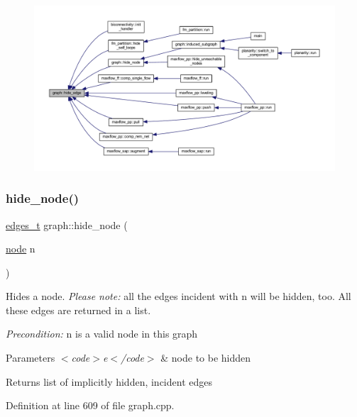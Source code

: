 \begin{figure}[H]
\begin{center}
\leavevmode
\includegraphics[width=350pt]{classgraph_ab2f8520bcac080d73c55228fecc61825_icgraph}
\end{center}
\end{figure}
\mbox{\label{classgraph_a214618b5e3c02695779350532506e225}} 
\subsubsection{\texorpdfstring{hide\+\_\+node()}{hide\_node()}}
{\footnotesize\ttfamily \mbox{\hyperlink{edge_8h_a8f9587479bda6cf612c103494b3858e3}{edges\+\_\+t}} graph\+::hide\+\_\+node (\begin{DoxyParamCaption}\item[{\mbox{\hyperlink{classnode}{node}}}]{n }\end{DoxyParamCaption})}

Hides a node. {\itshape Please note\+:} all the edges incident with {\ttfamily n} will be hidden, too. All these edges are returned in a list.

{\itshape Precondition\+:} {\ttfamily n} is a valid node in this graph


\begin{DoxyParams}{Parameters}
{\em $<$code$>$e$<$/code$>$} & node to be hidden \\
\hline
\end{DoxyParams}
\begin{DoxyReturn}{Returns}
list of implicitly hidden, incident edges 
\end{DoxyReturn}


Definition at line 609 of file graph.\+cpp.


